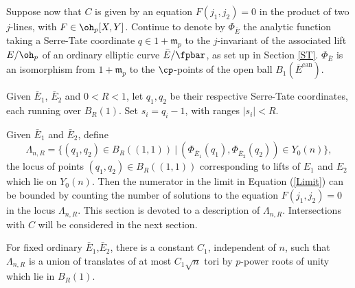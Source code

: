 \documentclass[12pt,letterpaper]{article}
\begin{document}
	Suppose now that $C$ is given by an equation $F(j_1,j_2)=0$ in the product of two $j$-lines, with $F\in \oh_p[X,Y]$. Continue to denote by $\Phi_{\bar{E}}$ the analytic function taking a Serre-Tate coordinate $q\in 1+\mathfrak{m}_p$ to the $j$-invariant of the associated lift $E/ \oh_p$ of an ordinary elliptic curve $\bar{E}/\fpbar$, as set up in Section \ref{ST}. $\Phi_{\bar{E}}$ is an isomorphism from $1+\mathfrak{m}_p$ to the $\cp$-points of the open ball $B_1({\bar{E}}^{\text{can}})$. 
	
	Given $\bar{E}_1$, $\bar{E}_2$ and $0<R<1$, let $q_1,q_2$ be their respective Serre-Tate coordinates, each running over $B_R(1)$. Set $s_i = q_i-1$, with ranges $|s_i|<R$. 

	
	Given $\bar{E}_1$ and $\bar{E}_2$, define
		\[\Lambda_{n,R} = \{(q_1,q_2)\in B_R((1,1)) \ | \ (\Phi_{\bar{E}_1}(q_1),\Phi_{\bar{E}_2}(q_2))\in Y_0(n)\},\]
	the locus of points $(q_1,q_2)\in B_R((1,1))$ corresponding to lifts of $E_1$ and $E_2$ which lie on $Y_0(n)$. Then the numerator in the limit in Equation (\ref{Limit}) can be bounded by counting the number of solutions to the equation $F(j_1,j_2)=0$ in the locus $\Lambda_{n,R}$. This section is devoted to a description of $\Lambda_{n,R}$. Intersections with $C$ will be considered in the next section.
	
	
	
	
	\begin{lemma}\label{listoftori}
		For fixed ordinary $\bar{E}_1$,$\bar{E}_2$, there is a constant $C_1$, independent of $n$, such that $\Lambda_{n,R}$ is a union of translates of at most $C_1\sqrt{n}$ tori by $p$-power roots of unity which lie in $B_R(1)$.
	\end{lemma}
	
\end{document}
